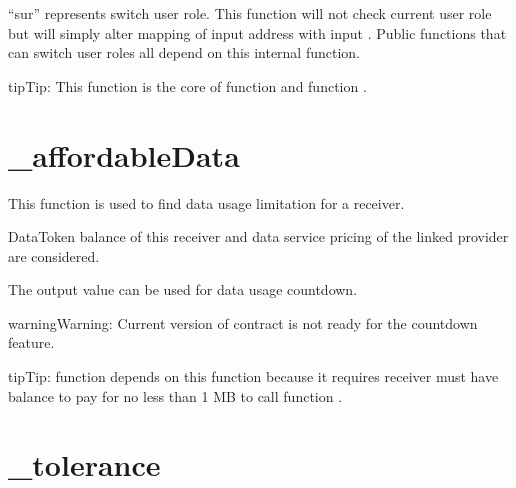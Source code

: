 \documentclass[letterpaper,10pt,english]{sphinxmanual}
\begin{document}
“sur” represents switch user role. This function will not check current user role but will
simply alter {\hyperref[\detokenize{index:identification}]{}} mapping of input  address with input .
Public functions that can switch user roles all depend on this internal function.

\begin{sphinxadmonition}{tip}{Tip:}
This function is the core of function {\hyperref[\detokenize{index:surreceiver}]{}} and function {\hyperref[\detokenize{index:surprovider}]{}}.
\end{sphinxadmonition}


\section{\_affordableData}
\label{\detokenize{index:affordabledata}}
%
\begin{sphinxVerbatim}[commandchars=\\\{\}]
     
\end{sphinxVerbatim}

This function is used to find data usage limitation for a receiver.

DataToken balance of this receiver and data service pricing of the linked provider are considered.

The output value can be used for data usage countdown.

\begin{sphinxadmonition}{warning}{Warning:}
Current version of contract is not ready for the countdown feature.
\end{sphinxadmonition}

\begin{sphinxadmonition}{tip}{Tip:}
function {\hyperref[\detokenize{index:link}]{}} depends on this function because it requires receiver must have balance to pay for no less than 1 MB to call function {\hyperref[\detokenize{index:link}]{}}.
\end{sphinxadmonition}


\section{\_tolerance}
\label{\detokenize{index:tolerance}}
%
\begin{sphinxVerbatim}[commandchars=\\\{\}]
     
\end{sphinxVerbatim}
\end{document}
